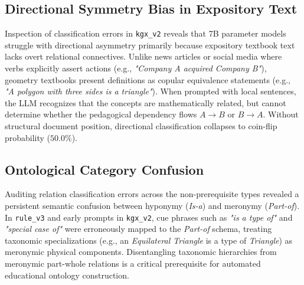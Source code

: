 \subsection{Directional Symmetry Bias in Expository Text}
Inspection of classification errors in \texttt{kgx\_v2} reveals that 7B parameter models struggle with directional asymmetry primarily because expository textbook text lacks overt relational connectives. Unlike news articles or social media where verbs explicitly assert actions (e.g., \textit{"Company A acquired Company B"}), geometry textbooks present definitions as copular equivalence statements (e.g., \textit{"A polygon with three sides is a triangle"}). When prompted with local sentences, the LLM recognizes that the concepts are mathematically related, but cannot determine whether the pedagogical dependency flows $A \to B$ or $B \to A$. Without structural document position, directional classification collapses to coin-flip probability ($50.0\%$).

\subsection{Ontological Category Confusion}
Auditing relation classification errors across the non-prerequisite types revealed a persistent semantic confusion between hyponymy (\textit{Is-a}) and meronymy (\textit{Part-of}). In \texttt{rule\_v3} and early prompts in \texttt{kgx\_v2}, cue phrases such as \textit{"is a type of"} and \textit{"special case of"} were erroneously mapped to the \textit{Part-of} schema, treating taxonomic specializations (e.g., an \textit{Equilateral Triangle} is a type of \textit{Triangle}) as meronymic physical components. Disentangling taxonomic hierarchies from meronymic part-whole relations is a critical prerequisite for automated educational ontology construction.
